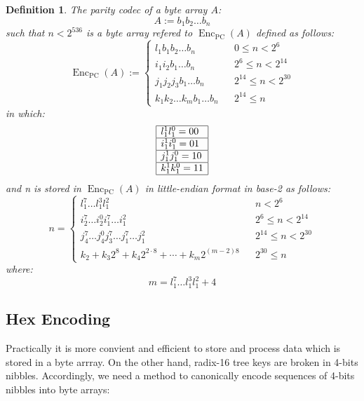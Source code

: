 \documentclass{article}
\newcommand{\assign}{:=}
\newcommand{\cdummy}{\cdot}
\newcommand{\tmop}[1]{\ensuremath{\operatorname{#1}}}
\newcommand{\tmverbatim}[1]{{\ttfamily{#1}}}
\newtheorem{definition}{Definition}
\begin{document}
\begin{definition}
  The parity codec of a byte array $A$:
  \[ A \assign b_1 b_2 \ldots b_n \]
  such that $n < 2^{536}$ is a byte array refered to $\tmop{Enc}_{\tmop{PC}}
  (A)$ defined as follows:
  \[ \tmop{Enc}_{\tmop{PC}} (A) \assign \left\{ \begin{array}{lll}
       l^{}_1 b_1 b_2 \ldots b_n &  & 0 \leqslant n < 2^6\\
       i^{}_1 i^{}_2 b_1 \ldots b_n &  & 2^6 \leqslant n < 2^{14}\\
       j^{}_1 j^{}_2 j_3 b_1 \ldots b_n &  & 2^{14} \leqslant n < 2^{30}\\
       k_1^{} k_2^{} \ldots k_m^{} b_1 \ldots b_n &  & 2^{14} \leqslant n
     \end{array} \right. \]
  in which:
  \[ \begin{array}{|l|}
       \hline
       l^1_1 l_1^0 = 00\\
       \hline
       i^1_1 i_1^0 = 01\\
       \hline
       j^1_1 j_1^0 = 10\\
       \hline
       k^1_1 k_1^0 = 11\\
       \hline
     \end{array} \]
  and n is stored in $\tmop{Enc}_{\tmop{PC}} (A)$ in little-endian format in
  base-2 as follows:
  \[ n = \left\{ \begin{array}{lll}
       l^7_1 \ldots l^3_1 l^2_1 &  & n < 2^6\\
       i_2^7 \ldots i_2^0 i_1^7 \ldots i^2_1^{} &  & 2^6 \leqslant n <
       2^{14}\\
       j_4^7 \ldots j_4^0 j_3^7 \ldots j_1^7 \ldots j^2_1 &  & 2^{14}
       \leqslant n < 2^{30}\\
       k_2 + k_3 2^8 + k_4 2^{2 \cdummy 8} + \cdots + k_m 2^{(m - 2) 8} &  &
       2^{30} \leqslant n
     \end{array} \right. \]
  where:
  \[ m = l^7_1 \ldots l^3_1 l^2_1 + 4 \]
\end{definition}

\tmverbatim{}

\subsection{Hex Encoding}

Practically it is more convient and efficient to store and process data which
is stored in a byte arrray. On the other hand, radix-16 tree keys are broken
in 4-bits nibbles. Accordingly, we need a method to canonically encode
sequences of 4-bits nibbles into byte arrays:
\end{document}

